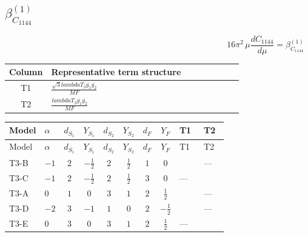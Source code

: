 \documentclass[8pt]{article}
\begin{document}
\begin{landscape}
\section*{$\beta_{C_{1144}}^{(1)}$}
\[16\pi^2\,\mu\frac{d C_{1144}}{d\mu}=\beta_{C_{1144}}^{(1)}\]
\begin{center}
\begin{tabular}{@{}c >{\raggedright\arraybackslash}p{0.82\linewidth}@{}}
\toprule
Column & Representative term structure \\
\midrule
T1 & \(\displaystyle \frac{\sqrt{3} lambdaT_{3} \overline{y_{1}} \overline{y_{2}}}{MF}\) \\
\midrule
T2 & \(\displaystyle \frac{lambdaT_{3} \overline{y_{1}} \overline{y_{2}}}{MF}\) \\
\midrule
\bottomrule
\end{tabular}
\end{center}
\smallskip
\tiny
\begin{longtable}{@{}llcccccc >{\raggedright\arraybackslash}p{0.21\linewidth} >{\raggedright\arraybackslash}p{0.21\linewidth}@{}}
\toprule
Model & $\alpha$ & $d_{S_1}$ & $Y_{S_1}$ & $d_{S_2}$ & $Y_{S_2}$ & $d_F$ & $Y_F$ & T1 & T2 \\
\midrule
\endfirsthead
\toprule
Model & $\alpha$ & $d_{S_1}$ & $Y_{S_1}$ & $d_{S_2}$ & $Y_{S_2}$ & $d_F$ & $Y_F$ & T1 & T2 \\
\midrule
\endhead
T3-B & $-1$ & $2$ & $-\frac{1}{2}$ & $2$ & $\frac{1}{2}$ & $1$ & $0$ & \scriptsize\adjustbox{max width=\linewidth}{$\begin{gathered} - \frac{2 \sqrt{3} lambdaT_{3} \overline{y_{1}} \overline{y_{2}}}{3 MF}\end{gathered}$} & --- \\
\midrule
T3-C & $-1$ & $2$ & $-\frac{1}{2}$ & $2$ & $\frac{1}{2}$ & $3$ & $0$ & --- & \scriptsize\adjustbox{max width=\linewidth}{$\begin{gathered} \frac{4 lambdaT_{3} \overline{y_{1}} \overline{y_{2}}}{3 MF}\end{gathered}$} \\
\midrule
T3-A & $0$ & $1$ & $0$ & $3$ & $1$ & $2$ & $\frac{1}{2}$ & \scriptsize\adjustbox{max width=\linewidth}{$\begin{gathered} - \frac{2 \sqrt{3} lambdaT_{3} \overline{y_{1}} \overline{y_{2}}}{3 MF}\end{gathered}$} & --- \\
\midrule
T3-D & $-2$ & $3$ & $-1$ & $1$ & $0$ & $2$ & $-\frac{1}{2}$ & \scriptsize\adjustbox{max width=\linewidth}{$\begin{gathered} - \frac{2 \sqrt{3} lambdaT_{3} \overline{y_{1}} \overline{y_{2}}}{3 MF}\end{gathered}$} & --- \\
\midrule
T3-E & $0$ & $3$ & $0$ & $3$ & $1$ & $2$ & $\frac{1}{2}$ & --- & \scriptsize\adjustbox{max width=\linewidth}{$\begin{gathered} \frac{2 lambdaT_{3} \overline{y_{1}} \overline{y_{2}}}{MF}\end{gathered}$} \\
\midrule
\bottomrule
\end{longtable}
\clearpage

\end{landscape}
\end{document}
